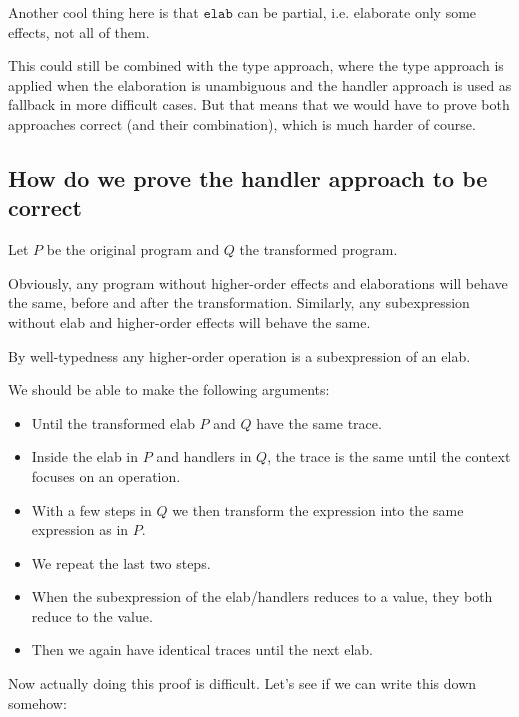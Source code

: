 \documentclass{article}
\newcommand\kw[1]{\ensuremath{\mathbf{\mathtt{#1}}}}
\newcommand\elab{\kw{elab}}
\begin{document}
Another cool thing here is that $\elab$ can be partial, i.e. elaborate only some effects, not all of them.

This could still be combined with the type approach, where the type approach is applied when the elaboration is unambiguous and the handler approach is used as fallback in more difficult cases. But that means that we would have to prove both approaches correct (and their combination), which is much harder of course.

\subsection{How do we prove the handler approach to be correct}

Let $P$ be the original program and $Q$ the transformed program.

Obviously, any program without higher-order effects and elaborations will behave the same, before and after the transformation. Similarly, any subexpression without elab and higher-order effects will behave the same.

By well-typedness any higher-order operation is a subexpression of an elab.

We should be able to make the following arguments:
\begin{itemize}
\item Until the transformed elab $P$ and $Q$ have the same trace.
\item Inside the elab in $P$ and handlers in $Q$, the trace is the same until the context focuses on an operation.
\item With a few steps in $Q$ we then transform the expression into the same expression as in $P$.
\item We repeat the last two steps.
\item When the subexpression of the elab/handlers reduces to a value, they both reduce to the value.
\item Then we again have identical traces until the next elab.
\end{itemize}

Now actually doing this proof is difficult. Let's see if we can write this down somehow:
\end{document}
